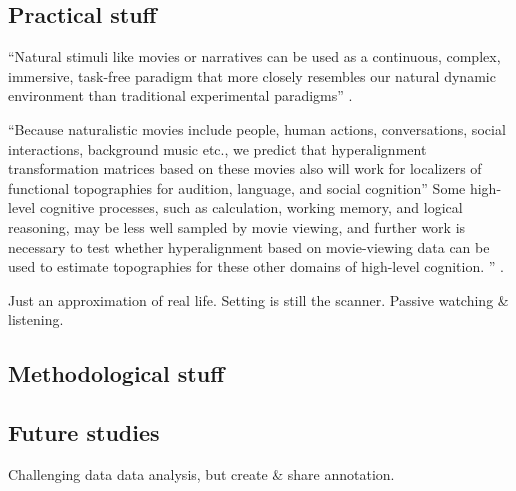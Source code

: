 \subsection{Practical stuff}



``Natural stimuli like movies \citep{eickhoff2020towards,
hasson2008neurocinematics, sonkusare2019naturalistic} or narratives
\citep{hamilton2018revolution, honey2012not, lerner2011topographic,
silbert2014coupled, wilson2008beyond} can be used as a continuous, complex,
immersive, task-free paradigm that more closely resembles our natural dynamic
environment than traditional experimental paradigms''
\citep{haeusler2022processing}.

%
``Because naturalistic movies include people, human actions, conversations,
social interactions, background music etc., we predict that hyperalignment
transformation matrices based on these movies also will work for localizers of
functional topographies for audition, language, and social cognition''
\citep{jiahui2020predicting}
%
Some high-level cognitive processes, such as calculation, working memory, and
logical reasoning, may be less well sampled by movie viewing, and further work
is necessary to test whether hyperalignment based on movie-viewing data can be
used to estimate topographies for these other domains of high-level cognition.
'' \citep{jiahui2020predicting}.


%
Just an approximation of real life.
%
Setting is still the scanner.
%
Passive watching \& listening.



\subsection{Methodological stuff}




\subsection{Future studies}
%
Challenging data data analysis, but create \& share annotation.

